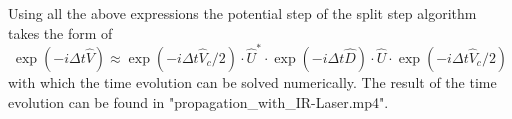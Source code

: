 \documentclass[12pt]{article}
\newcommand{\dt}{\Delta t}
\begin{document}
Using all the above expressions the potential step of the split step algorithm takes the form of
\begin{equation}
\exp(-i\dt\hat V)\approx \exp(-i\dt\hat V_c/2)\cdot\hat U^*\cdot \exp(-i \dt\hat D)\cdot\hat U\cdot \exp(-i \dt\hat V_c/2)
\end{equation}
with which the time evolution can be solved numerically. The result of the time evolution can be found in "propagation\_with\_IR-Laser.mp4".





\end{document}
